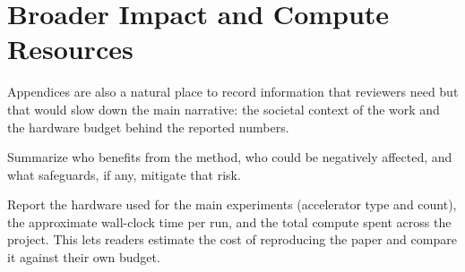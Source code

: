 \section{Broader Impact and Compute Resources}
\label{sec:app_broader_impact}

Appendices are also a natural place to record information that reviewers need
but that would slow down the main narrative: the societal context of the
work and the hardware budget behind the reported numbers.

Summarize who benefits from the method, who could be negatively affected, and
what safeguards, if any, mitigate that risk.

Report the hardware used for the main experiments (accelerator type and
count), the approximate wall-clock time per run, and the total compute spent
across the project. This lets readers estimate the cost of reproducing the
paper and compare it against their own budget.
